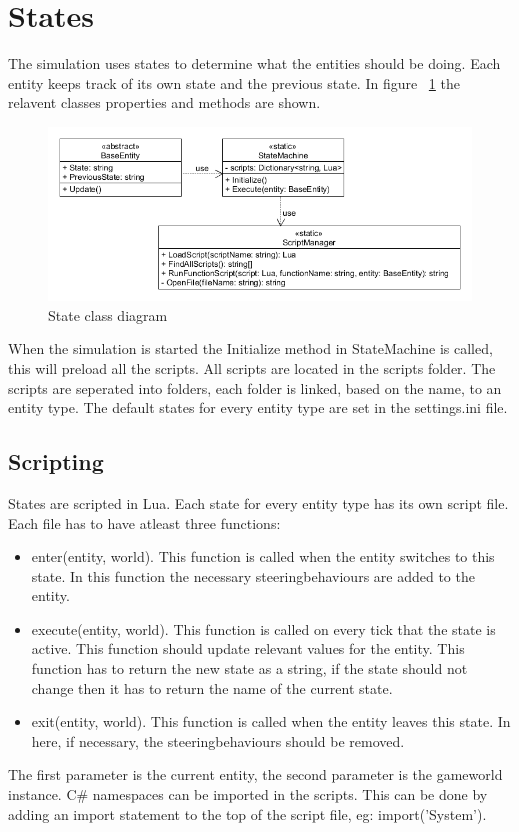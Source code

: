 \documentclass[10pt]{article}
\begin{document}
 
   \newpage   
   \section {States}
   The simulation uses states to determine what the entities should be doing. Each entity keeps track of its own state and the previous state. In figure ~\ref{fig:stateClassDiagram} the relavent classes properties and methods are shown. 
   \begin{figure}[h!]
   \includegraphics[width=\textwidth]{stateuml.png}
   \caption{State class diagram}
   \label{fig:stateClassDiagram}
   \end{figure}
   When the simulation is started the Initialize method in StateMachine is called, this will preload all the scripts. All scripts are located in the scripts folder. The scripts are seperated into folders, each folder is linked, based on the name, to an entity type.
   The default states for every entity type are set in the settings.ini file.
   \subsection {Scripting}
   States are scripted in Lua. Each state for every entity type has its own script file. Each file has to have atleast three functions: 
   \begin{itemize}
   \item enter(entity, world). This function is called when the entity switches to this state. In this function the necessary steeringbehaviours are added to the entity.
   \item execute(entity, world). This function is called on every tick that the state is active. This function should update relevant values for the entity. This function has to return the new state as a string, if the state should not change then it has to return the name of the current state.
   \item exit(entity, world). This function is called when the entity leaves this state. In here, if necessary, the steeringbehaviours should be removed.
   \end{itemize}
   The first parameter is the current entity, the second parameter is the gameworld instance. C\# namespaces can be imported in the scripts. This can be done by adding an import statement to the top of the script file, eg: import('System').
   
\end{document}
